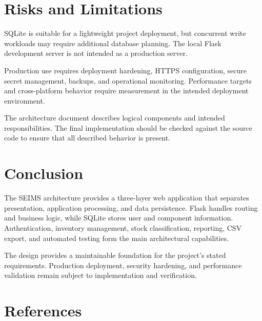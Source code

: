 \documentclass[conference]{IEEEtran}
\begin{document}
\section{Risks and Limitations}

SQLite is suitable for a lightweight project deployment, but concurrent write workloads may require additional database planning. The local Flask development server is not intended as a production server.

Production use requires deployment hardening, HTTPS configuration, secure secret management, backups, and operational monitoring. Performance targets and cross-platform behavior require measurement in the intended deployment environment.

The architecture document describes logical components and intended responsibilities. The final implementation should be checked against the source code to ensure that all described behavior is present.

\section{Conclusion}

The SEIMS architecture provides a three-layer web application that separates presentation, application processing, and data persistence. Flask handles routing and business logic, while SQLite stores user and component information. Authentication, inventory management, stock classification, reporting, CSV export, and automated testing form the main architectural capabilities.

The design provides a maintainable foundation for the project's stated requirements. Production deployment, security hardening, and performance validation remain subject to implementation and verification.

\section{References}
\end{document}
